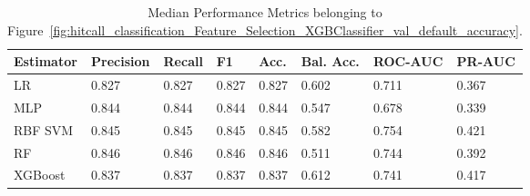 \begin{longtable}{llllllll}
\caption{Median Performance Metrics belonging to Figure~\ref{fig:hitcall_classification_Feature_Selection_XGBClassifier_val_default_accuracy}.}\label{tab:table:hitcall_classification_feature_selection_xgbclassifier_val_default_accuracy}\\
\toprule
\midrule
\small Estimator & \small Precision & \small Recall & \small F1 & \small Acc. & \small Bal. Acc. & \small ROC-AUC & \small PR-AUC\\
\hline
LR & 0.827 & 0.827 & 0.827 & 0.827 & 0.602 & 0.711 & 0.367\\
MLP & 0.844 & 0.844 & 0.844 & 0.844 & 0.547 & 0.678 & 0.339\\
RBF SVM & 0.845 & 0.845 & 0.845 & 0.845 & 0.582 & 0.754 & 0.421\\
RF & 0.846 & 0.846 & 0.846 & 0.846 & 0.511 & 0.744 & 0.392\\
XGBoost & 0.837 & 0.837 & 0.837 & 0.837 & 0.612 & 0.741 & 0.417\\
\bottomrule
\end{longtable}